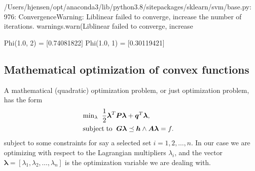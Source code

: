 \documentclass[letterpaper,10pt,english]{sphinxmanual}
\begin{document}
\begin{sphinxVerbatim}[commandchars=\\\{\}]
\end{sphinxVerbatim}

\noindent{}

\begin{sphinxVerbatim}[commandchars=\\\{\}]
/Users/hjensen/opt/anaconda3/lib/python3.8/site\PYGZhy{}packages/sklearn/svm/\PYGZus{}base.py:976: ConvergenceWarning: Liblinear failed to converge, increase the number of iterations.
  warnings.warn(\PYGZdq{}Liblinear failed to converge, increase \PYGZdq{}
\end{sphinxVerbatim}

\noindent{}

\noindent{}

\noindent{}

\begin{sphinxVerbatim}[commandchars=\\\{\}]
Phi(\PYGZhy{}1.0, \PYGZhy{}2) = [0.74081822]
Phi(\PYGZhy{}1.0, 1) = [0.30119421]
\end{sphinxVerbatim}

\noindent{}


\subsection{Mathematical optimization of convex functions}
\label{\detokenize{chapter7:mathematical-optimization-of-convex-functions}}
A mathematical (quadratic) optimization problem, or just optimization problem, has the form
\begin{equation*}
\begin{split}
\begin{align*}
    &\mathrm{min}_{\lambda}\hspace{0.2cm} \frac{1}{2}\boldsymbol{\lambda}^T\boldsymbol{P}\boldsymbol{\lambda}+\boldsymbol{q}^T\boldsymbol{\lambda},\\ \nonumber
    &\mathrm{subject\hspace{0.1cm}to} \hspace{0.2cm} \boldsymbol{G}\boldsymbol{\lambda} \preceq \boldsymbol{h} \wedge  \boldsymbol{A}\boldsymbol{\lambda}=f.
\end{align*}
\end{split}
\end{equation*}
subject to some constraints for say a selected set \(i=1,2,\dots, n\).
In our case we are optimizing with respect to the Lagrangian multipliers \(\lambda_i\), and the
vector \(\boldsymbol{\lambda}=[\lambda_1, \lambda_2,\dots, \lambda_n]\) is the optimization variable we are dealing with.
\end{document}
